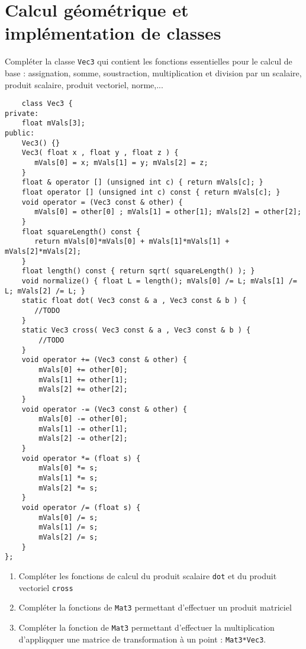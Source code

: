 \documentclass[a4paper,10pt]{tp_um}
\newcommand\code[1]{\texttt{#1}}
\begin{document}
\section{Calcul géométrique et implémentation de classes}

\label{sec_exo_Vec3}

Compléter la classe \code{Vec3} qui contient les fonctions essentielles pour le calcul de base : assignation, somme, soustraction, multiplication et division par un scalaire, produit scalaire, produit vectoriel, norme,...

\begin{verbatim}
    class Vec3 {
private:
    float mVals[3];
public:
    Vec3() {}
    Vec3( float x , float y , float z ) {
       mVals[0] = x; mVals[1] = y; mVals[2] = z;
    }
    float & operator [] (unsigned int c) { return mVals[c]; }
    float operator [] (unsigned int c) const { return mVals[c]; }
    void operator = (Vec3 const & other) {
       mVals[0] = other[0] ; mVals[1] = other[1]; mVals[2] = other[2];
    }
    float squareLength() const {
       return mVals[0]*mVals[0] + mVals[1]*mVals[1] + mVals[2]*mVals[2];
    }
    float length() const { return sqrt( squareLength() ); }
    void normalize() { float L = length(); mVals[0] /= L; mVals[1] /= L; mVals[2] /= L; }
    static float dot( Vec3 const & a , Vec3 const & b ) {
       //TODO
    }
    static Vec3 cross( Vec3 const & a , Vec3 const & b ) {
        //TODO
    }
    void operator += (Vec3 const & other) {
        mVals[0] += other[0];
        mVals[1] += other[1];
        mVals[2] += other[2];
    }
    void operator -= (Vec3 const & other) {
        mVals[0] -= other[0];
        mVals[1] -= other[1];
        mVals[2] -= other[2];
    }
    void operator *= (float s) {
        mVals[0] *= s;
        mVals[1] *= s;
        mVals[2] *= s;
    }
    void operator /= (float s) {
        mVals[0] /= s;
        mVals[1] /= s;
        mVals[2] /= s;
    }
};
\end{verbatim}

\begin{enumerate}
 \item Compléter les fonctions de calcul du produit scalaire \code{dot} et du produit vectoriel \code{cross}
\item Compléter la fonctions de \code{Mat3} permettant d'effectuer un produit matriciel
\item Compléter la fonction de \code{Mat3} permettant d'effectuer la multiplication d'appliqquer une matrice de transformation à un point : \code{Mat3*Vec3}.
\end{enumerate}
\end{document}
